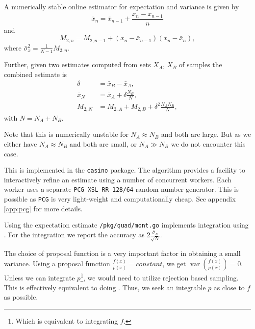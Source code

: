 \documentclass[10pt, a4paper]{article}
\begin{document}

  A numerically stable online estimator for expectation and variance is given by
  \begin{equation}
  \bar{x}_n = \bar{x}_{n-1} + \frac{x_n - \bar{x}_{n-1}}{n}
  \end{equation}
  and
  \begin{equation}
  M_{2,n} = M_{2,n-1} + (x_n - \bar{x}_{n-1})(x_n - \bar{x}_n),
  \end{equation}
  where $\bar{\sigma}_x^2 = \frac{1}{N-1} M_{2,n}$\cite{welford}.

  Further, given two estimates computed from sets $X_A$, $X_B$ of \iid{} samples the combined
  estimate is
  \begin{equation}
  \begin{split}
  \delta & = \bar{x}_B - \bar{x}_A, \\
  \bar{x}_N & = \bar{x}_A + \delta \frac{N_B}{N}, \\
  M_{2,N} & = M_{2,A} + M_{2,B} + \delta^2 \frac{N_A N_B}{N},
  \end{split}
  \end{equation}
  with $N = N_A + N_B$\cite{chan}.

  Note that this is numerically unstable for $N_A \approx N_B$ and both are large\cite{chan}. But as we
  either have $N_A \approx N_B$ and both are small, or $N_A \gg N_B$ we do not encounter this case.

  This is implemented in the \texttt{casino} package. The algorithm provides a facility to interactively
  refine an estimate using a number of concurrent workers. Each worker uses a separate \texttt{PCG XSL RR 128/64}
  random number generator. This is possible as \texttt{PCG} is very light-weight and computationally cheap\cite{pcg}.
  See appendix \ref{app:pcg} for more details.

  Using the expectation estimate \texttt{/pkg/quad/mont.go} implements integration using \is{}. For
  the \is{} integration we report the accuracy as $2\frac{\bar\sigma_N}{\sqrt N}$.

  The choice of proposal function is a very important factor in
  obtaining a small variance. Using a proposal function $\frac{f(x)}{p(x)} = constant$, we get
  $\operatorname{var}\left(\frac{f(x)}{p(x)}\right) = 0$. Unless we can integrate $p$\footnote{Which is
  equivalent to integrating $f$.}, we would need to utilize rejection based sampling. This is effectively
  equivalent to doing \is. Thus, we seek an integrable $p$ as close to $f$ as possible.
\end{document}
